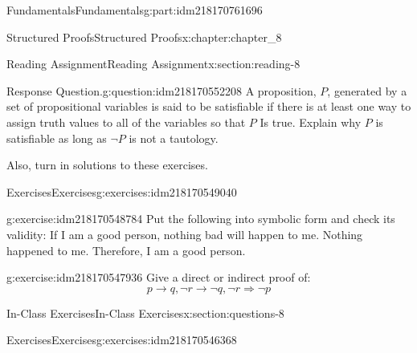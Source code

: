 \documentclass[oneside,10pt,]{book}
\numberwithin{equation}{section}
\begin{document}
\begin{partptx}{Fundamentals}{}{Fundamentals}{}{}{g:part:idm218170761696}
\begin{chapterptx}{Structured Proofs}{}{Structured Proofs}{}{}{x:chapter:chapter_8}
\begin{sectionptx}{Reading Assignment}{}{Reading Assignment}{}{}{x:section:reading-8}
\begin{question}{Response Question.}{g:question:idm218170552208}%
A proposition, \(P\), generated by a set of propositional variables is said to be satisfiable if there is at least one way to assign truth values to all of the variables so that \(P\) Is true. Explain why \(P\) is satisfiable as long as \(\neg P\)  is not a tautology.%
\end{question}
Also, turn in solutions to these exercises.%
%
%
\typeout{************************************************}
\typeout{************************************************}
%
\begin{exercises-subsection-numberless}{Exercises}{}{Exercises}{}{}{g:exercises:idm218170549040}
\par\medskip\noindent%
%
\begin{exercisegroup}
\begin{divisionexerciseeg}{1}{}{}{g:exercise:idm218170548784}%
Put the following into symbolic form and check its validity: If I am a good person, nothing bad will happen to me. Nothing happened to me. Therefore, I am a good person.%
\end{divisionexerciseeg}%
\begin{divisionexerciseeg}{2}{}{}{g:exercise:idm218170547936}%
Give  a direct or indirect proof of:%
\begin{equation*}
p\rightarrow  q, \neg r\rightarrow  \neg q, \neg r \Rightarrow  \neg p
\end{equation*}
%
\end{divisionexerciseeg}%
\end{exercisegroup}
\par\medskip\noindent
\end{exercises-subsection-numberless}
\end{sectionptx}
%
%
\typeout{************************************************}
\typeout{************************************************}
%
\begin{sectionptx}{In-Class Exercises}{}{In-Class Exercises}{}{}{x:section:questions-8}
%
%
%
\typeout{************************************************}
\typeout{************************************************}
%
\begin{exercises-subsection-numberless}{Exercises}{}{Exercises}{}{}{g:exercises:idm218170546368}
\par\medskip\noindent%
%
\begin{exercisegroup}

\end{exercisegroup}
\end{exercises-subsection-numberless}
\end{sectionptx}
\end{chapterptx}
\end{partptx}
\end{document}
